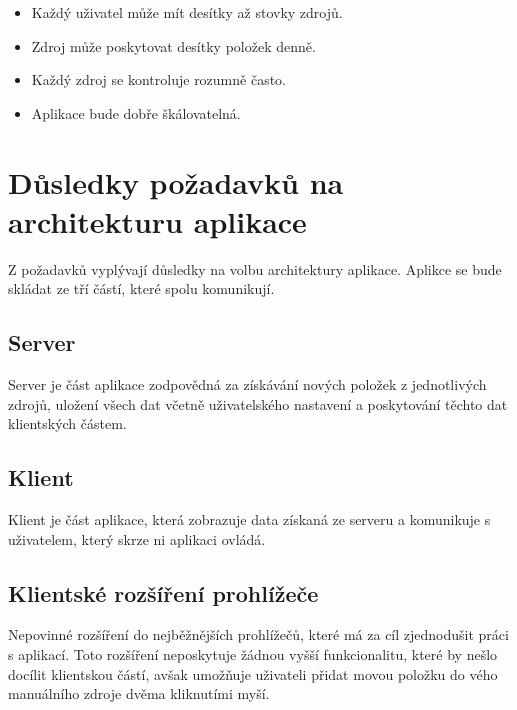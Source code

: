 \begin{itemize}
    \item Každý uživatel může mít desítky až stovky zdrojů.
	\item Zdroj může poskytovat desítky položek denně.
    \item Každý zdroj se kontroluje rozumně často.
    \item Aplikace bude dobře škálovatelná.
\end{itemize}

\section{Důsledky požadavků na architekturu aplikace}

Z požadavků vyplývají důsledky na volbu architektury aplikace.
Aplikce se bude skládat ze tří částí, které spolu komunikují.

\subsection{Server}

Server je část aplikace zodpovědná za získávání nových položek z jednotlivých zdrojů, uložení všech dat včetně uživatelského nastavení a poskytování těchto dat klientských částem.

\subsection{Klient}

Klient je část aplikace, která zobrazuje data získaná ze serveru a komunikuje s uživatelem, který skrze ni aplikaci ovládá.

\subsection{Klientské rozšíření prohlížeče}

Nepovinné rozšíření do nejběžnějších prohlížečů, které má za cíl zjednodušit práci s aplikací.
Toto rozšíření neposkytuje žádnou vyšší funkcionalitu, které by nešlo docílit klientskou částí, avšak umožňuje uživateli přidat movou položku do vého manuálního zdroje dvěma kliknutími myší.


